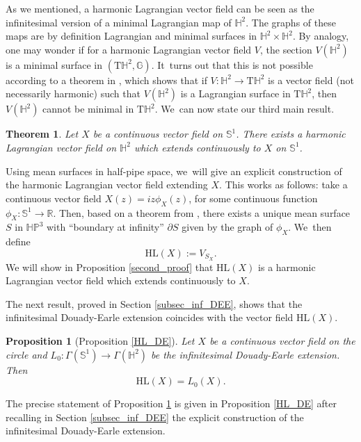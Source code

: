 \documentclass[JEP,XML,SOM,Unicode,NoEqCountersInSection, NoFloatCountersInSection,published]{cedram}
\theoremstyle{plain}
\newtheorem{theorem}[cor]{Theorem}
\newtheorem{prop}[cor]{Proposition}
\theoremstyle{definition}
\newcommand{\HP}{\mathbb{HP}^3}
\begin{document}
As we mentioned, a harmonic Lagrangian vector field can be seen as the infinitesimal version of a minimal Lagrangian map of \(\mathbb{H}^2\). The graphs of these maps are by definition Lagrangian and minimal surfaces in \(\mathbb{H}^2 \times \mathbb{H}^2\). By analogy, one may wonder if for a harmonic Lagrangian vector field \(V\), the section \(V(\mathbb{H}^2)\) is a minimal surface in \((\mathrm{T}\mathbb{H}^2, \mathbb{G})\). It~turns out that this is not possible according to a theorem in \cite[Prop.\,2.2]{ML_in_tangent_bundle}, which shows that if \(V: \mathbb{H}^2 \to \mathrm{T}\mathbb{H}^2\) is a vector field (not necessarily harmonic) such that \(V(\mathbb{H}^2)\) is a Lagrangian surface in \(\mathrm{T}\mathbb{H}^2\), then \(V(\mathbb{H}^2)\) cannot be minimal in \(\mathrm{T}\mathbb{H}^2\). We~can now state our third main result.
\begin{theorem}\label{intro_ex_HL}
Let \(X\) be a continuous vector field on \(\mathbb{S}^1\). There exists a harmonic Lagrangian vector field on \(\mathbb{H}^2\) which extends continuously to \(X\) on \(\mathbb{S}^1\).
\end{theorem}
Using mean surfaces in half-pipe space, we~will give an explicit construction of the harmonic Lagrangian vector field extending \(X\). This works as follows: take a continuous vector field \(X(z) = iz\phi_X(z)\), for some continuous function \(\phi_X: \mathbb{S}^1 \to \mathbb{R}\). Then, based on a theorem from \cite{barbotfillastre}, there exists a unique mean surface \(S\) in \(\HP\) with ``boundary at infinity'' \(\partial S\) given by the graph of \(\phi_X\). We~then define
\begin{equation}\label{intro_HL}
\mathrm{HL}(X) := V_{S_X}.
\end{equation}
We will show in Proposition \ref{second_proof} that \(\mathrm{HL}(X)\) is a harmonic Lagrangian vector field which extends continuously to \(X\).

The next result, proved in Section \ref{subsec_inf_DEE}, shows that the infinitesimal Douady-Earle extension coincides with the vector field \(\mathrm{HL}(X)\).

\begin{prop}[Proposition \ref{HL_DE}]\label{intro_pro_DE}
Let \(X\) be a continuous vector field on the circle and \(L_0: \Gamma(\mathbb{S}^1) \to \Gamma(\mathbb{H}^2)\) be the infinitesimal Douady-Earle extension. Then
\[
\mathrm{HL}(X) = L_0(X).
\]
\end{prop}
The precise statement of Proposition \ref{intro_pro_DE} is given in Proposition \ref{HL_DE} after recalling in Section \ref{subsec_inf_DEE} the explicit construction of the infinitesimal Douady-Earle extension.
\end{document}
